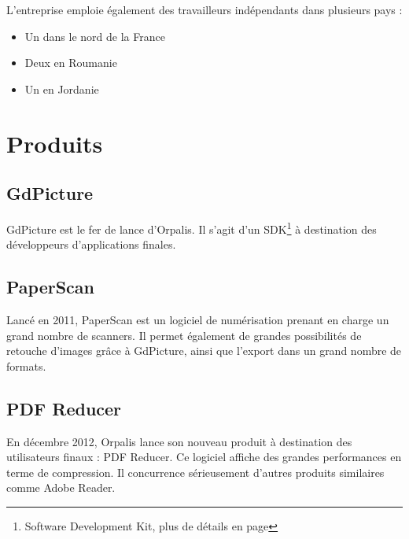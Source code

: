L'entreprise emploie également des travailleurs indépendants dans plusieurs pays :

\begin{itemize}
\item Un dans le nord de la France
\item Deux en Roumanie
\item Un en Jordanie
\end{itemize}

\section{Produits}

\subsection{GdPicture}

GdPicture est le fer de lance d'Orpalis. Il s'agit d'un SDK\footnote{Software Development Kit, plus de détails en page \pageref{gdpicture}} à destination des développeurs d'applications finales.

\subsection{PaperScan}

Lancé en 2011, PaperScan est un logiciel de numérisation prenant en charge un grand nombre de scanners. Il permet également de grandes possibilités de retouche d'images grâce à GdPicture, ainsi que l'export dans un grand nombre de formats.

\subsection{PDF Reducer}

En décembre 2012, Orpalis lance son nouveau produit à destination des utilisateurs finaux : PDF Reducer. Ce logiciel affiche des grandes performances en terme de compression. Il concurrence sérieusement d'autres produits similaires comme Adobe Reader.